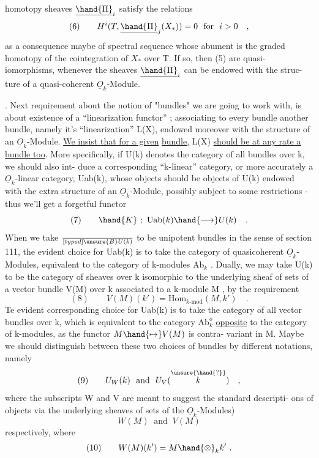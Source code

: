 
homotopy sheaves $\underline{\hand{\Pi}}_i$ satisfy the relations
\[ (6) \qquad H^i(T, \underline{\hand{\Pi}}_j(X_*)) = 0 \ \text{ for } \ i > 0 \quad , \]
as a consequence maybe of  spectral sequence whose abument is the graded
homotopy of the cointegration of $X_*$ over T. If so, then (5) are quasi-%
iomorphisms, whenever  the sheaves $\underline{\hand{\Pi}}_i$ can be endowed with the struc-%
ture of a quasi-coherent $\underline{O}_k$-Module.

. Next requirement about the notion of "bundles" we are going to work
with, is about existence of a ``linearization functor'' ; associating to
every bundle another bundle, namely it's ``linearization'' L(X), endowed
moreover with the structure of an $\underline{O}_k$-Module. \uline{We insist that for a given}
\uline{bundle,} L(X) \uline{should be at any rate a bundle too}. More specifically,
if U(k) denotes the category of all bundles over k, we should also int-%
duce a corresponding ``k-linear'' category, or more accurately a $\underline{O}_k$-linear
category, Uab(k), whose objects should be objects of U(k) endowed
with the extra structure of an $\underline{O}_k$-Module, possibly subject to some 
restrictions -  thus we'll get a forgetful functor
\[ (7) \qquad \hand{K} \ ; \ \mathrm{Uab}(k) \hand{\longrightarrow} U(k) \quad . \]
When we take $\over[typed]{\unsure{B}}{U}(k)$ to be unipotent bundles in the sense of section 111,
the evident choice for Uab(k) is to take the category of quasicoherent
$\underline{O}_k$-Modules, equivalent to the category of k-modules $\mathrm{Ab}_k$ . Dually,
we may take U(k) to be the category of sheaves over k isomorphic to the
underlying sheaf of sets of a vector bundle  V(M) over k associated
to a k-module M , by the requirement
\[ (8) \qquad V(M)(k') = \mathrm{Hom}_{k\text{-mod}}(M,k') \quad . \]
Te evident corresponding choice for Uab(k) is to take the category of
all vector bundles over k, which is equivalent to the category $\mathrm{Ab}_k^{o}$
\uline{opposite} to the category of k-modules, as the functor $M \hand{\mapsto} V(M)$ is contra-%
variant in M. Maybe we should distinguish between these two choices
of bundles by different notations, namely
\[ (9) \qquad U_W(k) \ \text{ and } \ U_V(\overset{\unsure{\hand{?}}}{k}) \quad , \]
where the subscripts W and V are meant to suggest the standard descripti-%
ons of objects via \hand{(}the \deleted{(}underlying sheaves of sets of the $\underline{O}_k$-Modules)
\[ W(M) \ \text{ and } \ V(M) \]
respectively, where 
\[ (10) \qquad W(M)(k') = M \hand{\otimes}_k k' \ . \]

